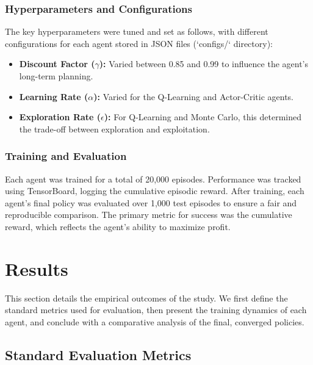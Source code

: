 \documentclass{article}
\begin{document}
\subsubsection{Hyperparameters and Configurations}

The key hyperparameters were tuned and set as follows, with different configurations for each agent stored in JSON files (`configs/` directory):
\begin{itemize}
    \item \textbf{Discount Factor (\(\gamma\)):} Varied between 0.85 and 0.99 to influence the agent's long-term planning.
    \item \textbf{Learning Rate (\(\alpha\)):} Varied for the Q-Learning and Actor-Critic agents.
    \item \textbf{Exploration Rate (\(\epsilon\)):} For Q-Learning and Monte Carlo, this determined the trade-off between exploration and exploitation.
\end{itemize}

\subsubsection{Training and Evaluation}

Each agent was trained for a total of 20,000 episodes. Performance was tracked using TensorBoard, logging the cumulative episodic reward. After training, each agent's final policy was evaluated over 1,000 test episodes to ensure a fair and reproducible comparison. The primary metric for success was the cumulative reward, which reflects the agent's ability to maximize profit.

\section{Results}

This section details the empirical outcomes of the study. We first define the standard metrics used for evaluation, then present the training dynamics of each agent, and conclude with a comparative analysis of the final, converged policies.

\subsection{Standard Evaluation Metrics}
\end{document}
